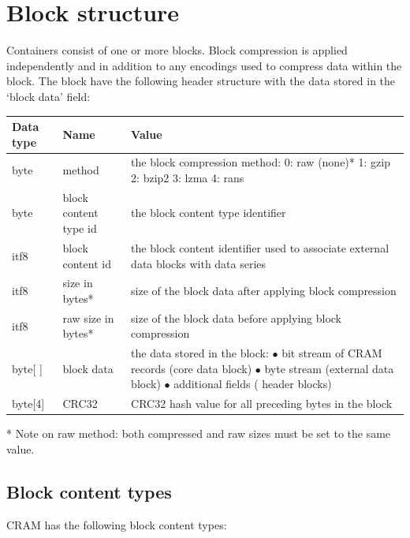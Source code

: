 \documentclass[a4paper]{article}
\begin{document}
\section{\textbf{Block structure}}

Containers consist of one or more blocks. Block compression is applied independently 
and in addition to any encodings used to compress data within the block. The block 
have the following header structure with the data stored in the `block data' field:

\begin{tabular}{|l|>{\raggedright}p{120pt}|>{\raggedright}p{260pt}|}
\hline
\textbf{Data type} & \textbf{Name} & \textbf{Value}
\tabularnewline
\hline
byte & method & the block compression method: \linebreak{}
0: raw (none)*\linebreak{}
1: gzip\linebreak{}
2: bzip2\linebreak{}
3: lzma\linebreak{}
4: rans\tabularnewline
\hline
byte & block content type id & the block content type identifier\tabularnewline
\hline
itf8 & block content id & the block content identifier used to associate external 
data blocks with data series\tabularnewline
\hline
itf8 & size in bytes* & size of the block data after applying block compression\tabularnewline
\hline
itf8 & raw size in bytes* & size of the block data before applying block compression\tabularnewline
\hline
byte[ ] & block data & the data stored in the block:\linebreak{}
$\bullet$ bit stream of CRAM records (core data block)\linebreak{}
$\bullet$ byte stream (external data block)\linebreak{}
$\bullet$ additional fields ( header blocks)\tabularnewline
\hline
byte[4] & CRC32 & CRC32 hash value for all preceding bytes in the block\tabularnewline
\hline
\end{tabular}

* Note on raw method: both compressed and raw sizes must be set to the same value.

\subsection{\textbf{Block content types}}

CRAM has the following block content types:
\end{document}

